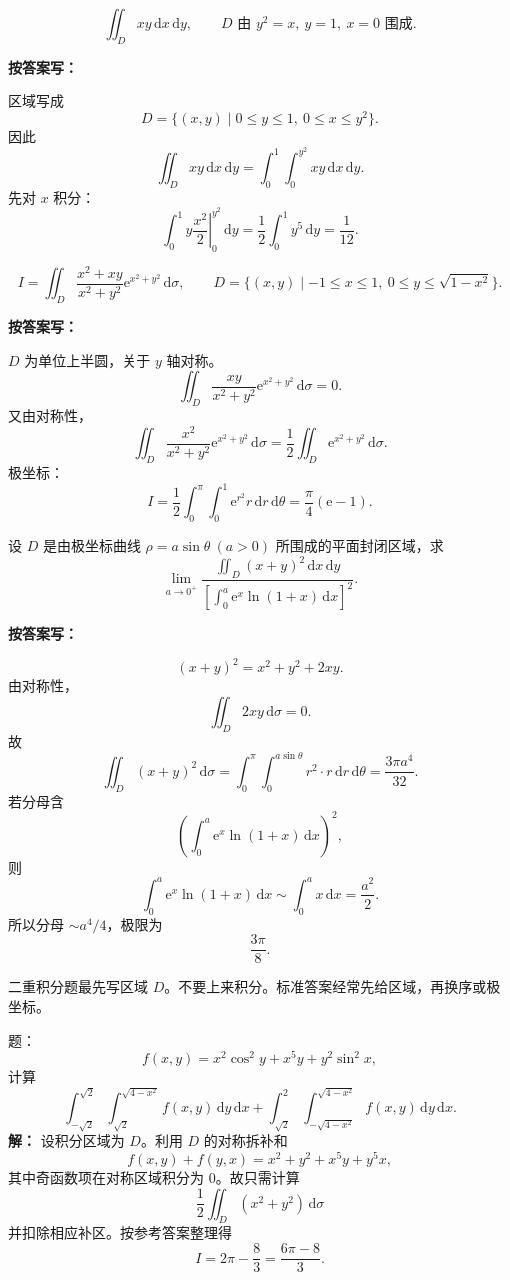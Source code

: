 \documentclass[11pt,a4paper,UTF8]{ctexart}
\newcommand{\dd}{\,\mathrm d}
\newcommand{\ee}{\mathrm e}
\begin{document}
\begin{answerbox}[例 3：直接按区域积分，2020--2021]
\[
\iint_D xy\dd x\dd y,\qquad
D\text{ 由 }y^2=x,\ y=1,\ x=0\text{ 围成}.
\]

\textbf{按答案写：}

区域写成
\[
D=\{(x,y)\mid 0\le y\le1,\ 0\le x\le y^2\}.
\]
因此
\[
\iint_D xy\dd x\dd y
=\int_0^1\int_0^{y^2}xy\dd x\dd y.
\]
先对 \(x\) 积分：
\[
\int_0^1 y\left.\frac{x^2}{2}\right|_0^{y^2}\dd y
=\frac12\int_0^1y^5\dd y
=\boxed{\frac1{12}.}
\]
\end{answerbox}

\begin{answerbox}
\[
I=\iint_D\frac{x^2+xy}{x^2+y^2}\ee^{x^2+y^2}\dd\sigma,\qquad
D=\{(x,y)\mid -1\le x\le1,\ 0\le y\le \sqrt{1-x^2}\}.
\]

\textbf{按答案写：}

\(D\) 为单位上半圆，关于 \(y\) 轴对称。
\[
\iint_D\frac{xy}{x^2+y^2}\ee^{x^2+y^2}\dd\sigma=0.
\]
又由对称性，
\[
\iint_D\frac{x^2}{x^2+y^2}\ee^{x^2+y^2}\dd\sigma
=\frac12\iint_D\ee^{x^2+y^2}\dd\sigma.
\]
极坐标：
\[
I=\frac12\int_0^\pi\int_0^1\ee^{r^2}r\dd r\dd\theta
=\boxed{\frac\pi4(\ee-1)}.
\]
\end{answerbox}

\begin{answerbox}[例 5：小区域极限，2022--2023]
设 \(D\) 是由极坐标曲线 \(\rho=a\sin\theta\ (a>0)\) 所围成的平面封闭区域，求
\[
\lim_{a\to0^+}
\frac{\displaystyle\iint_D(x+y)^2\dd x\dd y}
{\left[\displaystyle\int_0^a\ee^x\ln(1+x)\dd x\right]^2}.
\]

\textbf{按答案写：}

\[
(x+y)^2=x^2+y^2+2xy.
\]
由对称性，
\[
\iint_D2xy\dd\sigma=0.
\]
故
\[
\iint_D(x+y)^2\dd\sigma
=\int_0^\pi\int_0^{a\sin\theta}r^2\cdot r\dd r\dd\theta
=\frac{3\pi a^4}{32}.
\]
若分母含
\[
\left(\int_0^a\ee^x\ln(1+x)\dd x\right)^2,
\]
则
\[
\int_0^a\ee^x\ln(1+x)\dd x\sim\int_0^a x\dd x=\frac{a^2}{2}.
\]
所以分母 \(\sim a^4/4\)，极限为
\[
\boxed{\frac{3\pi}{8}}.
\]
\end{answerbox}

\begin{scorebox}[得分点]
二重积分题最先写区域 \(D\)。不要上来积分。标准答案经常先给区域，再换序或极坐标。
\end{scorebox}

\newpage

\begin{answerbox}[2020--2021 大题：二重积分对称性]
题：
\[
f(x,y)=x^2\cos^2y+x^5y+y^2\sin^2x,
\]
计算
\[
\int_{-\sqrt2}^{\sqrt2}\int_{\sqrt2}^{\sqrt{4-x^2}} f(x,y)\dd y\dd x
+\int_{\sqrt2}^2\int_{-\sqrt{4-x^2}}^{\sqrt{4-x^2}} f(x,y)\dd y\dd x.
\]
\textbf{解：}
设积分区域为 \(D\)。利用 \(D\) 的对称拆补和
\[
f(x,y)+f(y,x)=x^2+y^2+x^5y+y^5x,
\]
其中奇函数项在对称区域积分为 \(0\)。故只需计算
\[
\frac12\iint_D(x^2+y^2)\dd\sigma
\]
并扣除相应补区。按参考答案整理得
\[
I=2\pi-\frac{8}{3}
=\boxed{\frac{6\pi-8}{3}}.
\]
\end{answerbox}
\end{document}

